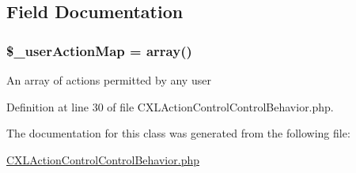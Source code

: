 \subsection{Field Documentation}
\hypertarget{classCXLActionControlBehavior_a7632198654cfa044b1d5f296f634078e}{
\subsubsection[{\$\_\-userActionMap}]{\setlength{\rightskip}{0pt plus 5cm}\$\_\-userActionMap = array()}}
\label{classCXLActionControlBehavior_a7632198654cfa044b1d5f296f634078e}
An array of actions permitted by any user 

Definition at line 30 of file CXLActionControlControlBehavior.php.



The documentation for this class was generated from the following file:\begin{DoxyCompactItemize}
\item 
\hyperlink{CXLActionControlControlBehavior_8php}{CXLActionControlControlBehavior.php}\end{DoxyCompactItemize}
